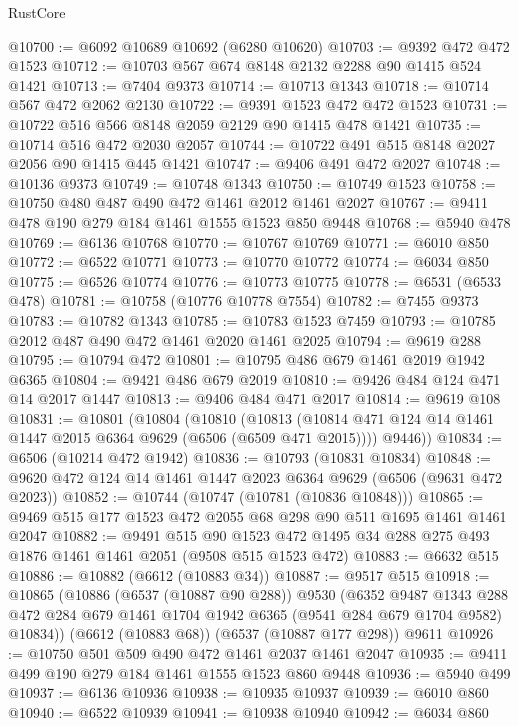 \begin{lexlean}{RustCore}
\begin{coremodule}
@10700 := @6092 @10689 @10692 (@6280 @10620)
@10703 := @9392 @472 @472 @1523
@10712 := @10703 @567 @674 @8148 @2132 @2288 @90 @1415 @524 @1421
@10713 := @7404 @9373
@10714 := @10713 @1343
@10718 := @10714 @567 @472 @2062 @2130
@10722 := @9391 @1523 @472 @472 @1523
@10731 := @10722 @516 @566 @8148 @2059 @2129 @90 @1415 @478 @1421
@10735 := @10714 @516 @472 @2030 @2057
@10744 := @10722 @491 @515 @8148 @2027 @2056 @90 @1415 @445 @1421
@10747 := @9406 @491 @472 @2027
@10748 := @10136 @9373
@10749 := @10748 @1343
@10750 := @10749 @1523
@10758 := @10750 @480 @487 @490 @472 @1461 @2012 @1461 @2027
@10767 := @9411 @478 @190 @279 @184 @1461 @1555 @1523 @850 @9448
@10768 := @5940 @478
@10769 := @6136 @10768
@10770 := @10767 @10769
@10771 := @6010 @850
@10772 := @6522 @10771
@10773 := @10770 @10772
@10774 := @6034 @850
@10775 := @6526 @10774
@10776 := @10773 @10775
@10778 := @6531 (@6533 @478)
@10781 := @10758 (@10776 @10778 @7554)
@10782 := @7455 @9373
@10783 := @10782 @1343
@10785 := @10783 @1523 @7459
@10793 := @10785 @2012 @487 @490 @472 @1461 @2020 @1461 @2025
@10794 := @9619 @288
@10795 := @10794 @472
@10801 := @10795 @486 @679 @1461 @2019 @1942 @6365
@10804 := @9421 @486 @679 @2019
@10810 := @9426 @484 @124 @471 @14 @2017 @1447
@10813 := @9406 @484 @471 @2017
@10814 := @9619 @108
@10831 := @10801
    (@10804
      (@10810
        (@10813 (@10814 @471 @124 @14 @1461 @1447 @2015 @6364 @9629 (@6506 (@6509 @471 @2015))))
        @9446))
@10834 := @6506 (@10214 @472 @1942)
@10836 := @10793 (@10831 @10834)
@10848 := @9620 @472 @124 @14 @1461 @1447 @2023 @6364 @9629 (@6506 (@9631 @472 @2023))
@10852 := @10744 (@10747 (@10781 (@10836 @10848)))
@10865 := @9469 @515 @177 @1523 @472 @2055 @68 @298 @90 @511 @1695 @1461 @1461 @2047
@10882 := @9491
    @515
    @90
    @1523
    @472
    @1495
    @34
    @288
    @275
    @493
    @1876
    @1461
    @1461
    @2051
    (@9508 @515 @1523 @472)
@10883 := @6632 @515
@10886 := @10882 (@6612 (@10883 @34))
@10887 := @9517 @515
@10918 := @10865
    (@10886
      (@6537 (@10887 @90 @288))
      @9530
      (@6352
        @9487
        @1343
        @288
        @472
        @284
        @679
        @1461
        @1704
        @1942
        @6365
        (@9541 @284 @679 @1704 @9582)
        @10834))
    (@6612 (@10883 @68))
    (@6537 (@10887 @177 @298))
    @9611
@10926 := @10750 @501 @509 @490 @472 @1461 @2037 @1461 @2047
@10935 := @9411 @499 @190 @279 @184 @1461 @1555 @1523 @860 @9448
@10936 := @5940 @499
@10937 := @6136 @10936
@10938 := @10935 @10937
@10939 := @6010 @860
@10940 := @6522 @10939
@10941 := @10938 @10940
@10942 := @6034 @860

\end{coremodule}
\end{lexlean}
